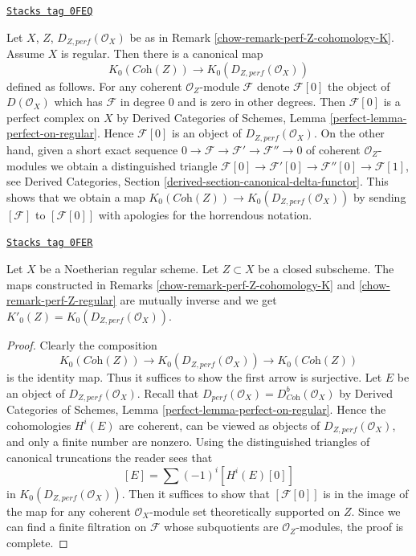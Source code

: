 \begin{remark}
\label{chow-remark-perf-Z-regular}
\href{https://stacks.math.columbia.edu/tag/0FEQ}{\texttt{Stacks tag 0FEQ}}

Let $X$, $Z$, $D_{Z, perf}(\mathcal{O}_X)$ be as in
Remark \ref{chow-remark-perf-Z-cohomology-K}. Assume $X$ is regular.
Then there is a canonical map
$$
K_0(\textit{Coh}(Z)) \longrightarrow K_0(D_{Z, perf}(\mathcal{O}_X))
$$
defined as follows. For any coherent $\mathcal{O}_Z$-module
$\mathcal{F}$ denote $\mathcal{F}[0]$ the object of $D(\mathcal{O}_X)$
which has $\mathcal{F}$ in degree $0$ and is zero in other degrees.
Then $\mathcal{F}[0]$ is a perfect complex on $X$ by
Derived Categories of Schemes, Lemma \ref{perfect-lemma-perfect-on-regular}.
Hence $\mathcal{F}[0]$ is an object of $D_{Z, perf}(\mathcal{O}_X)$.
On the other hand, given a short exact sequence
$0 \to \mathcal{F} \to \mathcal{F}' \to \mathcal{F}'' \to 0$ of
coherent $\mathcal{O}_Z$-modules we obtain a distinguished triangle
$\mathcal{F}[0] \to \mathcal{F}'[0] \to \mathcal{F}''[0] \to \mathcal{F}[1]$,
see Derived Categories, Section \ref{derived-section-canonical-delta-functor}.
This shows that we obtain a map
$K_0(\textit{Coh}(Z)) \to K_0(D_{Z, perf}(\mathcal{O}_X))$
by sending $[\mathcal{F}]$ to $[\mathcal{F}[0]]$
with apologies for the horrendous notation.
\end{remark}

\begin{lemma}
\label{chow-lemma-perf-Z-regular}
\href{https://stacks.math.columbia.edu/tag/0FER}{\texttt{Stacks tag 0FER}}

Let $X$ be a Noetherian regular scheme.
Let $Z \subset X$ be a closed subscheme. The maps constructed
in Remarks \ref{chow-remark-perf-Z-cohomology-K} and
\ref{chow-remark-perf-Z-regular} are mutually inverse and we get
$K'_0(Z) = K_0(D_{Z, perf}(\mathcal{O}_X))$.
\end{lemma}

\begin{proof}
Clearly the composition
$$
K_0(\textit{Coh}(Z)) \longrightarrow
K_0(D_{Z, perf}(\mathcal{O}_X)) \longrightarrow
K_0(\textit{Coh}(Z))
$$
is the identity map. Thus it suffices to show the first arrow is
surjective. Let $E$ be an object of $D_{Z, perf}(\mathcal{O}_X)$.
Recall that $D_{perf}(\mathcal{O}_X) = D^b_{\textit{Coh}}(\mathcal{O}_X)$
by Derived Categories of Schemes, Lemma
\ref{perfect-lemma-perfect-on-regular}.
Hence the cohomologies $H^i(E)$ are coherent, can be viewed
as objects of $D_{Z, perf}(\mathcal{O}_X)$, and only a finite number
are nonzero. Using the distinguished triangles of canonical truncations the
reader sees that
$$
[E] = \sum (-1)^i[H^i(E)[0]]
$$
in $K_0(D_{Z, perf}(\mathcal{O}_X))$. Then it suffices to
show that $[\mathcal{F}[0]]$ is in the image of the map
for any coherent $\mathcal{O}_X$-module set theoretically
supported on $Z$. Since we can find a finite filtration on
$\mathcal{F}$ whose subquotients are $\mathcal{O}_Z$-modules,
the proof is complete.
\end{proof}

